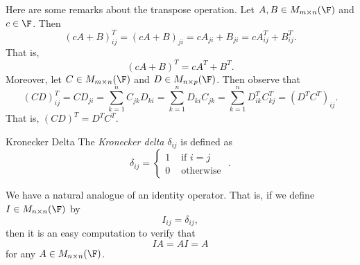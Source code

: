 \documentclass[linearalgebra]{subfiles}
\begin{document}
    \begin{remark}
        Here are some remarks about the transpose operation. Let $A, B\in M_{m\times n}(\F)$ and $c\in\F$. Then
        \begin{equation*}
            \left( cA+B \right) ^{T} _{ij} = \left( cA+B \right) _{ji} = cA_{ji}+B_{ji} = cA^{T} _{ij}+B^{T} _{ij}. 
        \end{equation*}
        That is,
        \begin{equation*}
            \left( cA+B \right) ^{T} = cA^{T} + B^{T} .
        \end{equation*}
        Moreover, let $C\in M_{m\times n}(\F)$ and $D\in M_{n\times p}(\F)$. Then observe that
        \begin{equation*}
            \left( CD \right) ^{T} _{ij} = CD_{ji} = \sum^{n}_{k=1} C_{jk}D_{ki} = \sum^{n}_{k=1} D_{ki}C_{jk} = \sum^{n}_{k=1} D^{T} _{ik}C^{T} _{kj} = \left( D^{T} C^{T}  \right) _{ij}.
        \end{equation*}
        That is, $\left( CD \right) ^{T} = D^{T} C^{T}$.
    \end{remark}

    \begin{definition}{Kronecker Delta}{}
        The \emph{Kronecker delta} $\delta_{ij}$ is defined as
        \begin{equation*}
            \delta_{ij} = \begin{cases} 1 &\text{ if } i=j \\ 0 &\text{ otherwise } \end{cases}.
        \end{equation*}
    \end{definition}

    \begin{remark}
        We have a natural analogue of an identity operator. That is, if we define $I\in M_{n\times n}(\F)$ by
        \begin{equation*}
            I_{ij} = \delta_{ij},
        \end{equation*}
        then it is an easy computation to verify that
        \begin{equation*}
            IA = AI = A
        \end{equation*}
        for any $A\in M_{n\times n}(\F)$.
    \end{remark}
\end{document}
